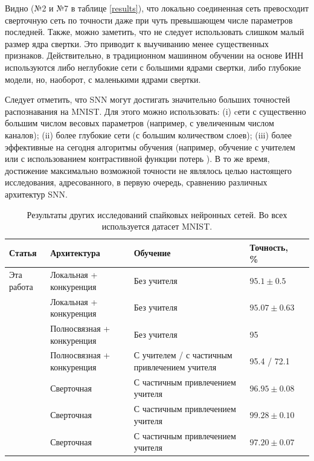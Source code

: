 \documentclass[a4paper]{article}
\begin{document}

Видно (№2 и №7 в таблице \ref{results}), что локально соединенная сеть превосходит сверточную сеть по точности даже при чуть превышающем числе параметров последней. Также, можно заметить, что не следует использовать слишком малый размер ядра свертки. Это приводит к выучиванию менее существенных признаков. Действительно, в традиционном машинном обучении на основе ИНН используются либо неглубокие сети с большими ядрами свертки, либо глубокие модели, но, наоборот, с маленькими ядрами свертки.

Следует отметить, что SNN могут достигать значительно больших точностей распознавания на MNIST. Для этого можно использовать: (i) cети с существенно большим числом весовых параметров (например, с увеличенным числом каналов); (ii) более глубокие сети (с большим количеством слоев); (iii) более эффективные на сегодня алгоритмы обучения (например, обучение с учителем или с использованием контрастивной функции потерь \cite{contrastive_loss}). В то же время, достижение максимально возможной точности не являлось целью настоящего исследования, адресованного, в первую очередь, сравнению различных архитектур SNN.

\begin{table}
 \caption{Результаты других исследований спайковых нейронных сетей. Во всех используется датасет MNIST.}
\begin{center}
\begin{tabular}{|l|p{4cm}|p{7cm}|l|l|}
\hline
Статья & Архитектура & Обучение & Точность, \% \\
\hline\hline
{Эта работа} & {Локальная + конкуренция} & {Без учителя} & {$95.1 \pm 0.5$}\\
\hline\hline
{\cite{saunders2019locally}} & {Локальная + конкуренция} & {Без учителя} & {$95.07 \pm 0.63$}\\
\hline
{\cite{mnist2}} & {Полносвязная + конкуренция} & {Без учителя} & {95}\\
\hline
{\cite{MaxActiv1}} & {Полносвязная + конкуренция} & {С учителем / с частичным привлечением учителя} & {95.4 / 72.1}\\
\hline
{\cite{conv1}} & {Сверточная} & {С частичным привлечением учителя} & {$96.95 \pm 0.08$}\\
\hline
{\cite{conv2}} & {Сверточная} & {С частичным привлечением учителя} & {$99.28 \pm 0.10$}\\
\hline
{\cite{conv3}} & {Сверточная} & {С частичным привлечением учителя} & {$97.20 \pm 0.07$}\\
\hline
\end{tabular}
\end{center}
\end{table}
\end{document}
